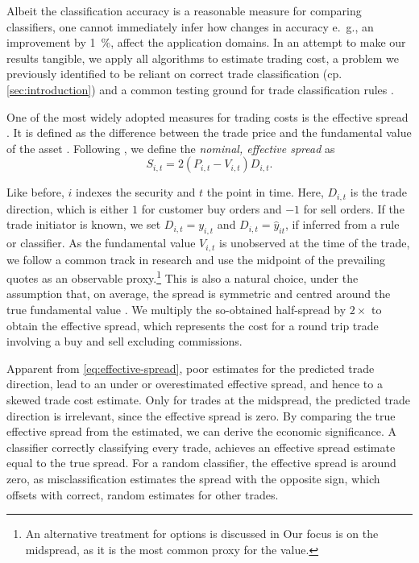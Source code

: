 Albeit the classification accuracy is a reasonable measure for comparing classifiers, one cannot immediately infer how changes in accuracy e.~g., an improvement by \SI{1}{\percent}, affect the application domains. In an attempt to make our results tangible, we apply all algorithms to estimate trading cost, a problem we previously identified to be reliant on correct trade classification (cp. \cref{sec:introduction}) and a common testing ground for trade classification rules \autocites[cp.][541]{ellisAccuracyTradeClassification2000}[][569]{finucaneDirectTestMethods2000}[][271--278]{petersonEvaluationBiasesExecution2003}[][896--897]{savickasInferringDirectionOption2003}.

One of the most widely adopted measures for trading costs is the effective spread \autocite[][112]{Piwowar_2006}. It is defined as the difference between the trade price and the fundamental value of the asset \autocite[][238--239]{bessembinderIssuesAssessingTrade2003}. Following \textcite[][238--239]{bessembinderIssuesAssessingTrade2003}, we define the \emph{nominal, effective spread} as
\begin{equation}
    S_{i,t} = 2 (P_{i,t} - V_{i,t}) D_{i,t}.
    \label{eq:effective-spread}
\end{equation}

Like before, $i$ indexes the security and $t$ the point in time. Here, $D_{i,t}$ is the trade direction, which is either $1$ for customer buy orders and $-1$ for sell orders. If the trade initiator is known, we set $D_{i,t} = y_{i,t}$ and $D_{i,t}=\hat{y}_{it}$, if inferred from a rule or classifier. As the fundamental value $V_{i,t}$ is unobserved at the time of the trade, we follow a common track in research and use the midpoint of the prevailing quotes as an observable proxy.\footnote{An alternative treatment for options is discussed in \textcite[][4975--4976]{muravyevOptionsTradingCosts2020} Our focus is on the midspread, as it is the most common proxy for the value.} This is also a natural choice, under the assumption that, on average, the spread is symmetric and centred around the true fundamental value \autocite[][1018]{leeMarketIntegrationPrice1993}. We multiply the so-obtained half-spread by $2 \times$ to obtain the effective spread, which represents the cost for a round trip trade involving a buy and sell excluding commissions.

Apparent from \cref{eq:effective-spread}, poor estimates for the predicted trade direction, lead to an under or overestimated effective spread, and hence to a skewed trade cost estimate. Only for trades at the midspread, the predicted trade direction is irrelevant, since the effective spread is zero. By comparing the true effective spread from the estimated, we can derive the economic significance. A classifier correctly classifying every trade, achieves an effective spread estimate equal to the true spread. For a random classifier, the effective spread is around zero, as misclassification estimates the spread with the opposite sign, which offsets with correct, random estimates for other trades.

